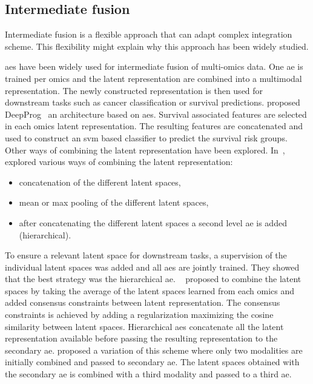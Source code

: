 \documentclass[../main.tex]{subfiles}
\begin{document}
	\subsection{Intermediate fusion}
		Intermediate fusion is a flexible approach that can adapt complex integration scheme.
		This flexibility might explain why this approach has been widely studied.

		\Glspl{ae} have been widely used for intermediate fusion of multi-omics data.
		One \gls{ae} is trained per omics and the latent representation are combined into a multimodal representation.
		The newly constructed representation is then used for downstream tasks such as cancer classification or survival predictions.
		\citeauthor{DeepProg} proposed DeepProg~\cite{DeepProg} an architecture based on \glspl{ae}.
		Survival associated features are selected in each omics latent representation.
		The resulting features are concatenated and used to construct an \gls{svm} based classifier to predict the survival risk groups.
		Other ways of combining the latent representation have been explored.
		In~\cite{Wissel2021}, \citeauthor{Wissel2021} explored various ways of combining the latent representation:
		\begin{itemize}[nosep]
			\item concatenation of the different latent spaces,
			\item mean or max pooling of the different latent spaces,
			\item after concatenating the different latent spaces a second level \gls{ae} is added (hierarchical).
		\end{itemize}
		To ensure a relevant latent space for downstream tasks, a supervision of the individual latent spaces was added and all \glspl{ae} are jointly trained.
		They showed that the best strategy was the hierarchical \gls{ae}.
		\citeauthor{Tong2021}~\cite{Tong2021} proposed to combine the latent spaces by taking the average of the latent spaces learned from each omics and added consensus constraints between latent representation.
		The consensus constraints is achieved by adding a regularization maximizing the cosine similarity between latent spaces.
		Hierarchical \glspl{ae} concatenate all the latent representation available before passing the resulting representation to the secondary \gls{ae}.
		\citeauthor{Wu2022StackedAB} proposed a variation of this scheme where only two modalities are initially combined and passed to secondary \gls{ae}.
		The latent spaces obtained with the secondary \gls{ae} is combined with a third modality and passed to a third \gls{ae}.
\end{document}
